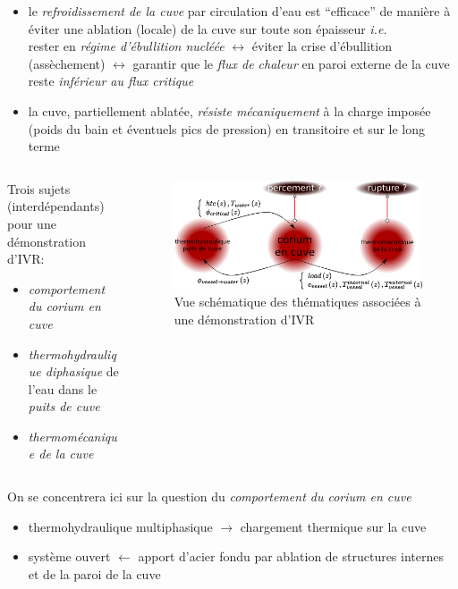 \begin{frame}[fragile]
\begin{itemize}
\begin{itemize}
  \item le \emph{refroidissement de la cuve} par circulation d'eau est ``efficace'' de manière à éviter une ablation (locale) de la cuve sur toute son épaisseur \textit{i.e.} \\
  rester en \emph{régime d'ébullition nucléée} $\leftrightarrow$ éviter la crise d'ébullition (assèchement) $\leftrightarrow$ garantir que le \emph{flux de chaleur} en paroi externe de la cuve reste \emph{inférieur au flux critique}
  \item la cuve, partiellement ablatée, \emph{résiste mécaniquement} à la charge imposée (poids du bain et éventuels pics de pression) en transitoire et sur le long terme
\end{itemize}
\end{itemize}
\end{frame}
\begin{frame}[fragile]
\begin{columns}
\begin{column}{0.45\textwidth}
Trois sujets (interdépendants) pour une démonstration d'IVR:
\begin{itemize}
  \item \emph{comportement du corium en cuve} 
  \item \emph{thermohydraulique diphasique} de l'eau dans le \emph{puits de cuve}
  \item \emph{thermomécanique de la cuve}
\end{itemize}
\end{column}
\begin{column}{0.55\textwidth}
\begin{figure}[H]
\centering \includegraphics[width=1.0\textwidth]{Figures/ivr_topics.eps}
\caption{Vue schématique des thématiques associées à une démonstration d'IVR}
\end{figure}
\end{column}
\end{columns}
On se concentrera ici sur la question du \emph{comportement du corium en cuve}
\begin{itemize}
\item thermohydraulique multiphasique $\rightarrow$ chargement thermique sur la cuve
\item système ouvert $\leftarrow$ apport d'acier fondu par ablation de structures internes et de la paroi de la cuve
\end{itemize}
\end{frame}

